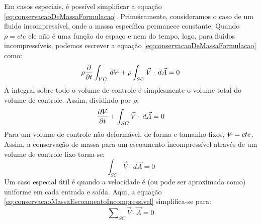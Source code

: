 \documentclass{article}
\newcommand{\stkout}[1]{\ifmmode\text{\sout{\ensuremath{#1}}}\else\sout{#1}\fi}
\begin{document}
Em casos especiais, é possível simplificar a equação \ref{eq:conservacaoDeMassaFormulacao}. Primeiramente, consideramos o caso de um fluido incompressível, onde a massa específica permanece constante. Quando $\rho = cte$ ele não é uma função do espaço e nem do tempo, logo, para fluidos incompressíveis, podemos escrever a equação \ref{eq:conservacaoDeMassaFormulacao} como:
\begin{align*}
  \rho \frac{\partial}{\partial t}\int_{VC}^{ } \, d\stkout{V} + \rho \int_{SC}^{ } \vec{V} \cdot \, d\vec{A}=0
\end{align*}
A integral sobre todo o volume de controle é simplesmente o volume total do volume de controle. Assim, dividindo por $\rho$:
\begin{align*}
 \frac{\partial \stkout V}{\partial t} +  \int_{SC}^{ } \vec{V} \cdot \, d\vec{A}=0
\end{align*}
Para um volume de controle não deformável, de forma e tamanho fixos, $\stkout{V} = cte$. Assim, a conservação de massa para um escoamento incompressível através de um volume de controle fixo torna-se:
\begin{equation}
  \int_{SC}^{ } \vec{V}\cdot\, d\vec{A}=0
  \label{eq:conservacaoMassaEscoamentoIncompressivel}
\end{equation}
Um caso especial útil é quando a velocidade é (ou pode ser aproximada como) uniforme em cada entrada e saída. Aqui, a equação \ref{eq:conservacaoMassaEscoamentoIncompressivel} simplifica-se para:
\begin{equation}
  \sum\nolimits_{SC} \vec{V} \cdot \vec{A}=0
  \label{eq:conservacaoMassaEscoamentoIncompressivelVelocidadeUniforme}
\end{equation}
\end{document}
